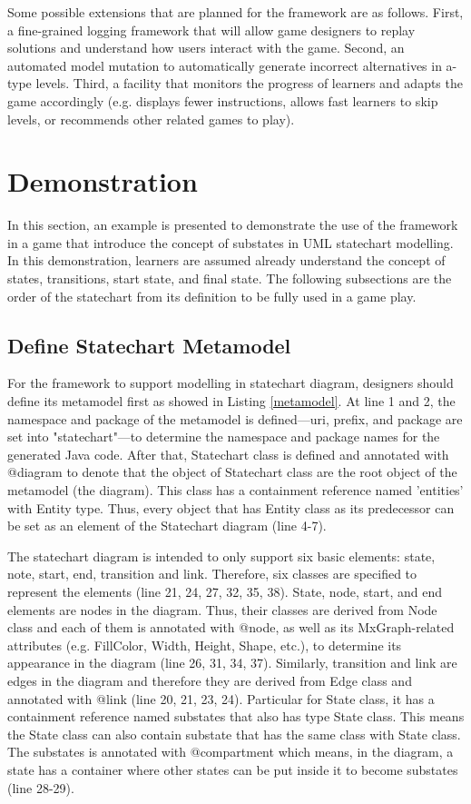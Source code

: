 \documentclass[conference]{IEEEtran}
\begin{document}
Some possible extensions that are planned for the framework are as follows. First, a fine-grained logging framework that will allow game designers to replay solutions and understand how users interact with the game. Second, an automated model mutation to automatically generate incorrect alternatives in a-type levels. Third, a facility that monitors the progress of learners and adapts the game accordingly (e.g. displays fewer instructions, allows fast learners to skip levels, or recommends other related games to play).

\section{Demonstration}
\label{Demonstration}
In this section, an example is presented to demonstrate the use of the framework in a game that introduce the concept of substates in UML statechart modelling. In this demonstration, learners are assumed already understand the concept of states, transitions, start state, and final state. The following subsections are the order of the statechart from its definition to be fully used in a game play.
 
\subsection{Define Statechart Metamodel}
For the framework to support modelling in statechart diagram, designers should define its metamodel first as showed in Listing \ref{metamodel}. 
At line 1 and 2, the namespace and package of the metamodel is defined---uri, prefix, and package are set into "statechart"---to determine the namespace and package names for the generated Java code. After that, Statechart class is defined and annotated with {\selectfont @diagram} to denote that the object of Statechart class are the root object of the metamodel (the diagram). This class has a containment reference named 'entities' with Entity type. Thus, every object that has Entity class as its predecessor can be set as an element of the Statechart diagram (line 4-7).  

The statechart diagram is intended to only support six basic elements: state, note, start, end, transition and link. Therefore, six classes are specified to represent the elements (line 21, 24, 27, 32, 35, 38). State, node, start, and end elements are nodes in the diagram. Thus, their classes are derived from Node class and each of them is annotated with {\selectfont @node}, as well as its MxGraph-related attributes (e.g. FillColor, Width, Height, Shape, etc.), to determine its appearance in the diagram (line 26, 31, 34, 37). Similarly, transition and link are edges in the diagram and therefore they are derived from Edge class and annotated with {\selectfont @link} (line 20, 21, 23, 24). Particular for State class, it has a containment reference named substates that also has type State class. This means the State class can also contain substate that has the same class with State class. The substates is annotated with {\selectfont @compartment} which means, in the diagram, a state has a container where other states can be put inside it to become substates (line 28-29).
\end{document}
